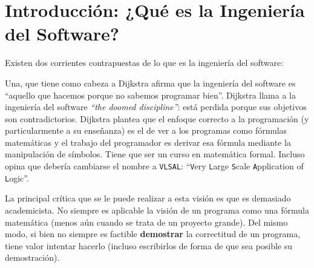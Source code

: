 \documentclass[]{article}
\begin{document}
\begin{titlepage}


\vfill %

\end{titlepage}




\thispagestyle{fancy}

\tableofcontents

\newpage

\section{Introducción: ¿Qué es la Ingeniería del Software?}
Existen dos corrientes contrapuestas de lo que es la ingeniería del software:

Una, que tiene como cabeza a Dijkstra afirma que la ingeniería del software es ``aquello que hacemos porque no sabemos programar bien''. Dijkstra llama a la ingeniería del software \emph{``the doomed discipline''}: está perdida porque sus objetivos son contradictorios. Dijkstra plantea que el enfoque correcto a la programación (y particularmente a su enseñanza) es el de ver a los programas como fórmulas matemáticas y el trabajo del programador es derivar esa fórmula mediante la manipulación de símbolos. Tiene que ser un curso en matemática formal. Incluso opina que debería cambiarse el nombre a \texttt{VLSAL}: ``\texttt{V}ery \texttt{L}arge \texttt{S}cale \texttt{A}pplication of \texttt{L}ogic''.

La principal crítica que se le puede realizar a esta visión es que es demasiado academicista. No siempre es aplicable la visión de un programa como una fórmula matemática (menos aún cuando se trata de un proyecto grande). Del mismo modo, si bien no siempre es factible \textbf{demostrar} la correctitud de un programa, tiene valor intentar hacerlo (incluso escribirlos de forma de que sea posible su demostración).
\end{document}
